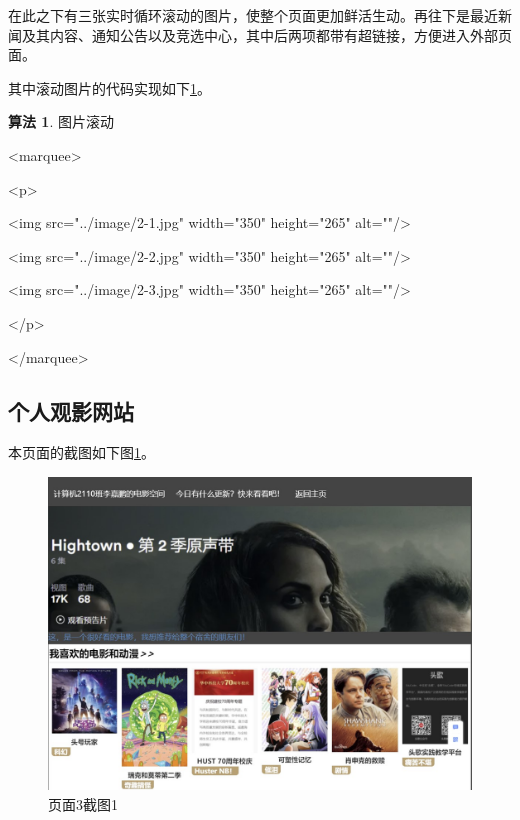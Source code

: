 \documentclass[supercite]{Experimental_Report}
\theoremstyle{definition}
\newtheorem{alg}{算法}[section]
\begin{document}
	在此之下有三张实时循环滚动的图片，使整个页面更加鲜活生动。再往下是最近新闻及其内容、通知公告以及竞选中心，其中后两项都带有超链接，方便进入外部页面。
	
	其中滚动图片的代码实现如下\ref{alg:4}。
	
	\begin{shaded*}\begin{alg}{图片滚动}
			\label{alg:4}
			\begin{algorithmic}
				<marquee>
				
				<p>
				
				<img src="../image/2-1.jpg" width="350" height="265" alt=""/>
				
				<img src="../image/2-2.jpg" width="350" height="265" alt=""/>
				
				<img src="../image/2-3.jpg" width="350" height="265" alt=""/>
				
				</p>
				
				</marquee>
			\end{algorithmic}
	\end{alg}\end{shaded*}
	
	\subsection{个人观影网站}
	
	本页面的截图如下图\ref{fig3-4}。
	
	\begin{figure}[htb]
		\begin{center}
			\includegraphics[scale=0.50]{images/3-4.jpg}
			\caption{页面3截图1}
			\label{fig3-4}
		\end{center}
	\end{figure}
\end{document}
